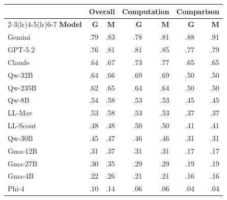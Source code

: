 \vspace{-2pt}
\noindent
\begin{minipage}[t]{0.48\textwidth}
\scriptsize
{}\label{tab:cap-per-judge}
\setlength{\tabcolsep}{2pt}
\begin{tabular}{@{}l rr rr rr@{}}
\toprule
 & \multicolumn{2}{c}{\textbf{Overall}} & \multicolumn{2}{c}{\textbf{Computation}} & \multicolumn{2}{c}{\textbf{Comparison}} \\
\cmidrule(lr){2-3}\cmidrule(lr){4-5}\cmidrule(lr){6-7}
\textbf{Model} & \textbf{G} & \textbf{M} & \textbf{G} & \textbf{M} & \textbf{G} & \textbf{M} \\
\midrule
Gemini    & .79 & .83 & .78 & .81 & .88 & .91 \\
GPT-5.2   & .76 & .81 & .81 & .85 & .77 & .79 \\
Claude    & .64 & .67 & .73 & .77 & .65 & .65 \\
Qw-32B    & .64 & .66 & .69 & .69 & .50 & .50 \\
Qw-235B   & .62 & .65 & .64 & .64 & .50 & .50 \\
Qw-8B     & .54 & .58 & .53 & .53 & .45 & .45 \\
LL-Mav    & .53 & .58 & .53 & .53 & .37 & .37 \\
LL-Scout  & .48 & .48 & .50 & .50 & .41 & .41 \\
Qw-30B    & .45 & .47 & .46 & .46 & .31 & .31 \\
Gma-12B   & .31 & .37 & .31 & .31 & .17 & .17 \\
Gma-27B   & .30 & .35 & .29 & .29 & .19 & .19 \\
Gma-4B    & .22 & .26 & .21 & .21 & .16 & .16 \\
Phi-4     & .10 & .14 & .06 & .06 & .04 & .04 \\
\bottomrule
\end{tabular}
\end{minipage}\hfill
